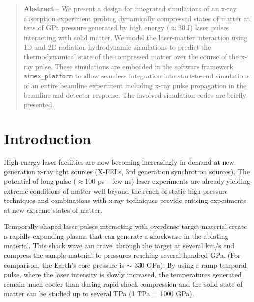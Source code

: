 \documentclass[10pt]{scrartcl}
\begin{document}
\tableofcontents

\begin{abstract}
  \noindent%
  \textbf{Abstract} -- We present a design for integrated simulations of an x-ray absorption
  experiment probing dynamically compressed states of matter at tens of GPa pressure generated by
  high energy ($\approx 30\,\text{J}$) laser pulses interacting with solid matter.
  We model the laser-matter interaction using 1D and 2D radiation-hydrodynamic simulations to predict
  the thermodynamical state of the compressed matter over the course of the x-ray pulse. These simulations
  are embedded in the software framework \texttt{simex\_platform} to allow seamless integration into
  start-to-end simulations of an entire beamline experiment including x-ray pulse propagation in the beamline and
  detector response. The involved simulation codes are briefly presented.
\end{abstract}
%
\section{Introduction}
High-energy laser facilities are now becoming increasingly in demand at new
generation x-ray light sources (X-FELs, 3rd generation synchrotron sources). The
potential of long pulse ($\approx$100 ps -- few ns) laser experiments are already yielding extreme
conditions of matter well beyond the reach of static high-pressure techniques
and combinations with x-ray techniques provide enticing experiments at new
extreme states of matter.

Temporally shaped laser pulses interacting with overdense target material create
a rapidly expanding plasma that can generate a shockwave in the ablating
material. This shock wave can travel through the target at several km/s and
compress the sample material to pressures reaching several hundred GPa. (For
comparison, the Earth's core pressure is $\sim$ 330 GPa). By using a ramp
temporal pulse, where the laser intensity is slowly increased, the temperatures
generated remain much cooler than during rapid shock compression and the solid
state of matter can be studied up to several TPa (1 TPa = 1000 GPa).
\end{document}
